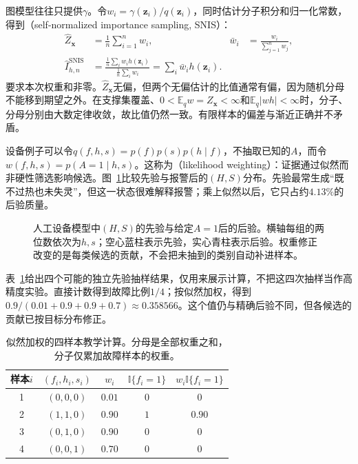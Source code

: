 图模型往往只提供$\gamma$。令$w_i=\gamma(\bm{z}_i)/q(\bm{z}_i)$，同时估计分子积分和归一化常数，得到（self-normalized importance sampling, SNIS）：
\begin{equation}
  \begin{aligned}
    \widehat Z_{\bm{x}}&=\frac{1}{n}\sum_{i=1}^{n}w_i,&
    \bar w_i&=\frac{w_i}{\sum_{j=1}^{n}w_j},\\
    \widehat I_{h,n}^{\mathrm{SNIS}}
      &=\frac{\frac{1}{n}\sum_i w_i h(\bm{z}_i)}
              {\frac{1}{n}\sum_i w_i}
       =\sum_i\bar w_i h(\bm{z}_i).
  \end{aligned}
  \label{eq:pgm-sampling-snis}
\end{equation}
要求本次权重和非零。$\widehat Z_{\bm{x}}$无偏，但两个无偏估计的比值通常有偏，因为随机分母不能移到期望之外。在支撑集覆盖、$0<\mathbb{E}_q w=Z_{\bm{x}}<\infty$和$\mathbb{E}_q|wh|<\infty$时，分子、分母分别由大数定律收敛，故比值仍然一致。有限样本的偏差与渐近正确并不矛盾。

设备例子可以令$q(f,h,s)=p(f)p(s)p(h\mid f)$，不抽取已知的$A$，而令$w(f,h,s)=p(A=1\mid h,s)$。这称为（likelihood weighting）：证据通过似然而非硬性筛选影响候选。图~\ref{fig:pgm-sampling-importance}比较先验与报警后的$(H,S)$分布。先验最常生成“既不过热也未失灵”，但这一状态很难解释报警；乘上似然以后，它只占约$4.13\%$的后验质量。

\begin{figure}[htbp]
  \centering
  
  \caption{人工设备模型中$(H,S)$的先验与给定$A=1$后的后验。横轴每组的两位数依次为$h,s$；空心蓝柱表示先验，实心青柱表示后验。权重修正改变的是每类候选的贡献，不会把未抽到的类别自动补进样本。}
  \label{fig:pgm-sampling-importance}
\end{figure}

表~\ref{tab:pgm-sampling-weight-example}给出四个可能的独立先验抽样结果，仅用来展示计算，不把这四次抽样当作高精度实验。直接计数得到故障比例$1/4$；按似然加权，得到$0.9/(0.01+0.9+0.9+0.7)\approx0.358566$。这个值仍与精确后验不同，但各候选的贡献已按目标分布修正。

\begin{table}[htbp]
  \centering
  \begin{tabular}{ccccc}
    \toprule
    样本$i$ & $(f_i,h_i,s_i)$ & $w_i$ & $\mathbb{I}\{f_i=1\}$ & $w_i\mathbb{I}\{f_i=1\}$\\
    \midrule
    1 & $(0,0,0)$ & $0.01$ & $0$ & $0$\\
    2 & $(1,1,0)$ & $0.90$ & $1$ & $0.90$\\
    3 & $(0,1,0)$ & $0.90$ & $0$ & $0$\\
    4 & $(0,0,1)$ & $0.70$ & $0$ & $0$\\
    \bottomrule
  \end{tabular}
  \caption{似然加权的四样本教学计算。分母是全部权重之和，分子仅累加故障样本的权重。}
  \label{tab:pgm-sampling-weight-example}
\end{table}

